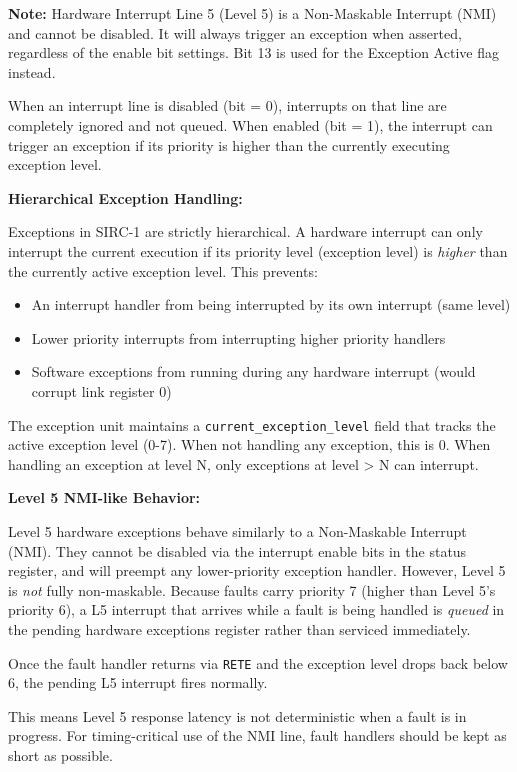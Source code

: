 \textbf{Note:} Hardware Interrupt Line 5 (Level 5) is a Non-Maskable Interrupt (NMI) and cannot be disabled.
It will always trigger an exception when asserted, regardless of the enable bit settings. Bit 13 is used for the
Exception Active flag instead.

When an interrupt line is disabled (bit = 0), interrupts on that line are completely ignored and not queued. When
enabled (bit = 1), the interrupt can trigger an exception if its priority is higher than the currently executing
exception level.

\textbf{Hierarchical Exception Handling:}

Exceptions in SIRC-1 are strictly hierarchical. A hardware interrupt can only interrupt the current execution if its
priority level (exception level) is \textit{higher} than the currently active exception level. This prevents:

\begin{itemize}
	\item An interrupt handler from being interrupted by its own interrupt (same level)
	\item Lower priority interrupts from interrupting higher priority handlers
	\item Software exceptions from running during any hardware interrupt (would corrupt link register 0)
\end{itemize}

The exception unit maintains a \texttt{current\_exception\_level} field that tracks the active exception level (0-7).
When not handling any exception, this is 0. When handling an exception at level N, only exceptions at level > N can
interrupt.

\textbf{Level 5 NMI-like Behavior:}

Level 5 hardware exceptions behave similarly to a Non-Maskable Interrupt (NMI). They cannot be disabled via the
interrupt enable bits in the status register, and will preempt any lower-priority exception handler. However, Level 5
is \textit{not} fully non-maskable. Because faults carry priority 7 (higher than Level 5's priority 6), a L5
interrupt that arrives while a fault is being handled is \textit{queued} in the pending hardware exceptions register
rather than serviced immediately.

Once the fault handler returns via \texttt{RETE} and the exception level drops back below 6, the pending L5
interrupt fires normally.

This means Level 5 response latency is not deterministic when a fault is in progress. For timing-critical use
of the NMI line, fault handlers should be kept as short as possible.

